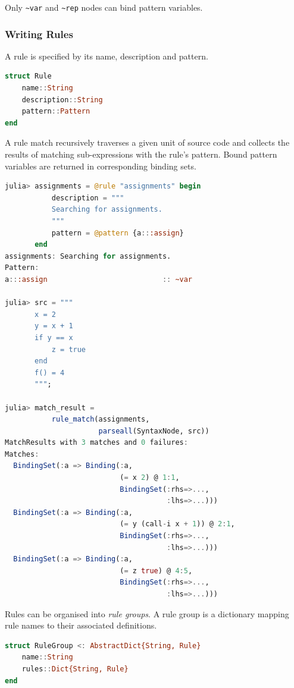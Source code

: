 \documentclass{juliacon}
\begin{document}
Only \texttt{\textasciitilde{}var} and \texttt{\textasciitilde{}rep} nodes can bind pattern variables.

\subsubsection{Writing Rules}
\label{sec:org73a41cd}

A rule is specified by its name, description and pattern.

\begin{lstlisting}[language=julia]
struct Rule
    name::String
    description::String
    pattern::Pattern
end
\end{lstlisting}

A rule match recursively traverses a given unit of source code and
collects the results of matching sub-expressions with the rule's
pattern. Bound pattern variables are returned in corresponding binding sets.

\begin{lstlisting}[language=julia]
julia> assignments = @rule "assignments" begin
           description = """
           Searching for assignments.
           """
           pattern = @pattern {a:::assign}
       end
assignments: Searching for assignments.
Pattern:
a:::assign                           :: ~var

julia> src = """
       x = 2
       y = x + 1
       if y == x
           z = true
       end
       f() = 4
       """;

julia> match_result =
           rule_match(assignments,
                      parseall(SyntaxNode, src))
MatchResults with 3 matches and 0 failures:
Matches:
  BindingSet(:a => Binding(:a,
                           (= x 2) @ 1:1,
                           BindingSet(:rhs=>...,
                                      :lhs=>...)))
  BindingSet(:a => Binding(:a,
                           (= y (call-i x + 1)) @ 2:1,
                           BindingSet(:rhs=>...,
                                      :lhs=>...)))
  BindingSet(:a => Binding(:a,
                           (= z true) @ 4:5,
                           BindingSet(:rhs=>...,
                                      :lhs=>...)))
\end{lstlisting}

Rules can be organised into \emph{rule groups}. A rule group is a
dictionary mapping rule names to their associated definitions.

\begin{lstlisting}[language=julia]
struct RuleGroup <: AbstractDict{String, Rule}
    name::String
    rules::Dict{String, Rule}
end
\end{lstlisting}
\end{document}

